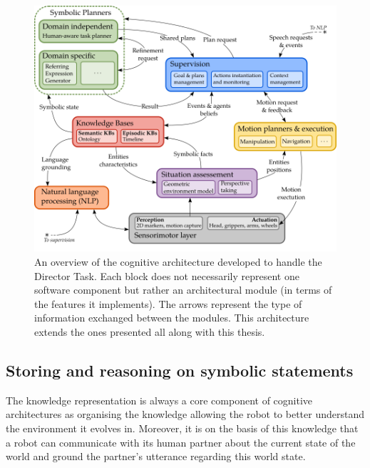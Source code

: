 \begin{figure}[ht!]
\centering
\includegraphics[width=\textwidth]{figures/chapter9/architecture.png}
\caption{\label{fig:chap9_architecture} An overview of the cognitive architecture developed to handle the Director Task. Each block does not necessarily represent one software component but rather an architectural module (in terms of the features it implements). The arrows represent the type of information exchanged between the modules. This architecture extends the ones presented all along with this thesis.}
\end{figure}

\subsection{Storing and reasoning on symbolic statements}

The knowledge representation is always a core component of cognitive architectures as organising the knowledge allowing the robot to better understand the environment it evolves in. Moreover, it is on the basis of this knowledge that a robot can communicate with its human partner about the current state of the world and ground the partner's utterance regarding this world state.

